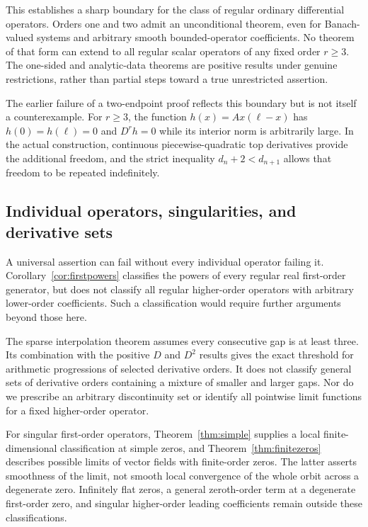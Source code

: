 \documentclass[11pt,reqno]{amsart}
\numberwithin{equation}{section}
\theoremstyle{definition}
\theoremstyle{remark}
\begin{document}
This establishes a sharp boundary for the class of regular ordinary differential operators. Orders one and two admit an unconditional theorem, even for Banach-valued systems and arbitrary smooth bounded-operator coefficients. No theorem of that form can extend to all regular scalar operators of any fixed order $r\ge3$. The one-sided and analytic-data theorems are positive results under genuine restrictions, rather than partial steps toward a true unrestricted assertion.

The earlier failure of a two-endpoint proof reflects this boundary but is not itself a counterexample. For $r\ge3$, the function $h(x)=A x(\ell-x)$ has $h(0)=h(\ell)=0$ and $D^rh=0$ while its interior norm is arbitrarily large. In the actual construction, continuous piecewise-quadratic top derivatives provide the additional freedom, and the strict inequality $d_n+2<d_{n+1}$ allows that freedom to be repeated indefinitely.

\subsection{Individual operators, singularities, and derivative sets}
A universal assertion can fail without every individual operator failing it. Corollary~\ref{cor:firstpowers} classifies the powers of every regular real first-order generator, but does not classify all regular higher-order operators with arbitrary lower-order coefficients. Such a classification would require further arguments beyond those here.

The sparse interpolation theorem assumes every consecutive gap is at least three. Its combination with the positive $D$ and $D^2$ results gives the exact threshold for arithmetic progressions of selected derivative orders. It does not classify general sets of derivative orders containing a mixture of smaller and larger gaps. Nor do we prescribe an arbitrary discontinuity set or identify all pointwise limit functions for a fixed higher-order operator.

For singular first-order operators, Theorem~\ref{thm:simple} supplies a local finite-dimensional classification at simple zeros, and Theorem~\ref{thm:finitezeros} describes possible limits of vector fields with finite-order zeros. The latter asserts smoothness of the limit, not smooth local convergence of the whole orbit across a degenerate zero. Infinitely flat zeros, a general zeroth-order term at a degenerate first-order zero, and singular higher-order leading coefficients remain outside these classifications.
\end{document}
